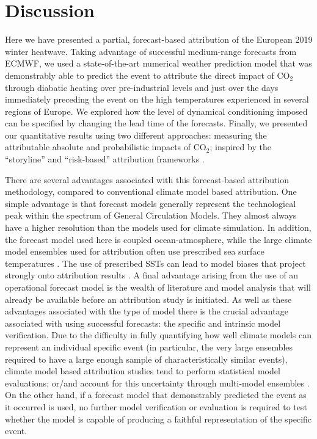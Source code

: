 \section{Discussion}\label{Ch4:discussion}

  Here we have presented a partial, forecast-based attribution of the European 2019 winter heatwave. Taking advantage of successful medium-range forecasts from ECMWF, we used a state-of-the-art numerical weather prediction model that was demonstrably able to predict the event to attribute the direct impact of CO$_2$ through diabatic heating over pre-industrial levels and just over the days immediately preceding the event on the high temperatures experienced in several regions of Europe. We explored how the level of dynamical conditioning imposed can be specified by changing the lead time of the forecasts. Finally, we presented our quantitative results using two different approaches: measuring the attributable absolute and probabilistic impacts of CO$_2$; inspired by the ``storyline'' and ``risk-based'' attribution frameworks \citep{stott_human_2004,shepherd_common_2016,winsberg_severe_2020,jezequel_behind_2018}.  
  
  There are several advantages associated with this forecast-based attribution methodology, compared to conventional climate model based attribution. One simple advantage is that forecast models generally represent the technological peak within the spectrum of General Circulation Models. They almost always have a higher resolution than the models used for climate simulation. In addition, the forecast model used here is coupled ocean-atmosphere, while the large climate model ensembles used for attribution often use prescribed sea surface temperatures \citep{ciavarella_upgrade_2018}. The use of prescribed SSTs can lead to model biases that project strongly onto attribution results \citep{fischer_biased_2018}. A final advantage arising from the use of an operational forecast model is the wealth of literature and model analysis that will already be available before an attribution study is initiated. As well as these advantages associated with the type of model there is the crucial advantage associated with using successful forecasts: the specific and intrinsic model verification. Due to the difficulty in fully quantifying how well climate models can represent an individual specific event (in particular, the very large ensembles required to have a large enough sample of characteristically similar events), climate model based attribution studies tend to perform statistical model evaluations; or/and account for this uncertainty through multi-model ensembles \citep{philip_protocol_2020}. On the other hand, if a forecast model that demonstrably predicted the event as it occurred is used, no further model verification or evaluation is required to test whether the model is capable of producing a faithful representation of the specific event.
  

